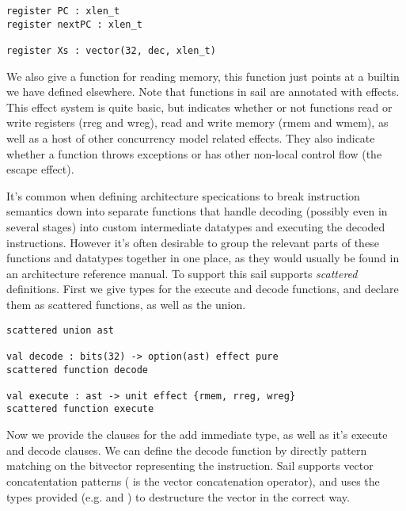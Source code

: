 \begin{lstlisting}
register PC : xlen_t
register nextPC : xlen_t

register Xs : vector(32, dec, xlen_t)
\end{lstlisting}

\sailrX
\sailfnrX
\sailfnrXA

\sailwX
\sailfnwX
\sailX

We also give a function  for reading memory, this function
just points at a builtin we have defined elsewhere. Note that
functions in sail are annotated with effects. This effect system is
quite basic, but indicates whether or not functions read or write
registers (rreg and wreg), read and write memory (rmem and wmem), as
well as a host of other concurrency model related effects. They also
indicate whether a function throws exceptions or has other non-local
control flow (the escape effect).

\sailMEMr
\sailfnMEMr

It's common when defining architecture specications to break
instruction semantics down into separate functions that handle
decoding (possibly even in several stages) into custom intermediate
datatypes and executing the decoded instructions. However it's often
desirable to group the relevant parts of these functions and datatypes
together in one place, as they would usually be found in an
architecture reference manual. To support this sail supports
\emph{scattered} definitions. First we give types for the execute and
decode functions, and declare them as scattered functions, as well as
the  union.

\sailiop

\begin{lstlisting}
scattered union ast

val decode : bits(32) -> option(ast) effect pure
scattered function decode

val execute : ast -> unit effect {rmem, rreg, wreg}
scattered function execute
\end{lstlisting}

Now we provide the clauses for the add immediate  type, as
well as it's execute and decode clauses. We can define the decode
function by directly pattern matching on the bitvector representing
the instruction. Sail supports vector concatentation patterns (
is the vector concatenation operator), and uses the types provided
(e.g.  and ) to destructure the vector in the
correct way.

